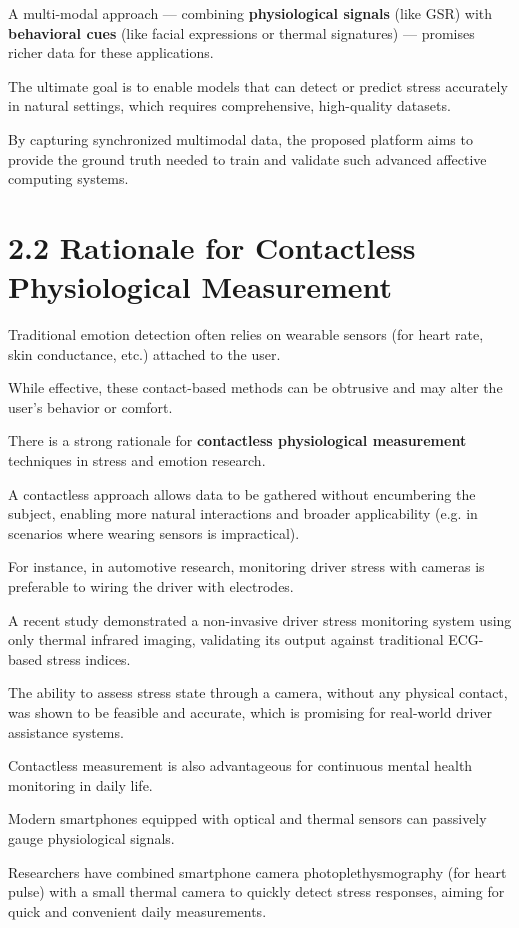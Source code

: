 A multi-modal approach --- combining \textbf{physiological signals}
 (like GSR) with \textbf{behavioral cues}
 (like facial expressions or thermal signatures) --- promises richer data for these applications.

The ultimate goal is to enable models that can detect or predict stress accurately in natural settings, which requires comprehensive, high-quality datasets.

By capturing synchronized multimodal data, the proposed platform aims to provide the ground truth needed to train and validate such advanced affective computing systems.

\section{2.2 Rationale for Contactless Physiological Measurement}

Traditional emotion detection often relies on wearable sensors (for heart rate, skin conductance, etc.) attached to the user.

While effective, these contact-based methods can be obtrusive and may alter the user's behavior or comfort.

There is a strong rationale for \textbf{contactless physiological measurement}
 techniques in stress and emotion research.

A contactless approach allows data to be gathered without encumbering the subject, enabling more natural interactions and broader applicability (e.g. in scenarios where wearing sensors is impractical).

For instance, in automotive research, monitoring driver stress with cameras is preferable to wiring the driver with electrodes.

A recent study demonstrated a non-invasive driver stress monitoring system using only thermal infrared imaging, validating its output against traditional ECG-based stress indices.

The ability to assess stress state through a camera, without any physical contact, was shown to be feasible and accurate, which is promising for real-world driver assistance systems.

Contactless measurement is also advantageous for continuous mental health monitoring in daily life.

Modern smartphones equipped with optical and thermal sensors can passively gauge physiological signals.

Researchers have combined smartphone camera photoplethysmography (for heart pulse) with a small thermal camera to quickly detect stress responses, aiming for quick and convenient daily measurements.

